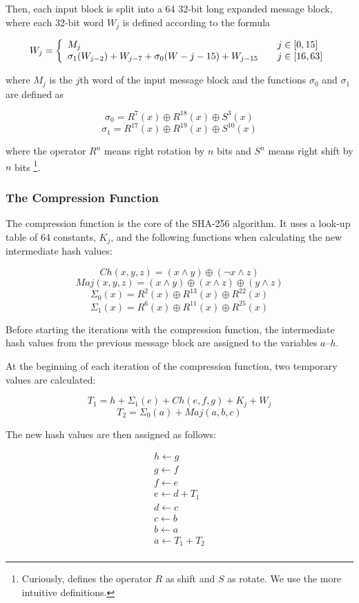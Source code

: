 Then, each input block is split into a 64 32-bit long expanded message block, where
each 32-bit word $W_j$ is defined according to the formula

\[ W_j = \left\{
	\begin{array}{l l}
		M_j & \quad j \in \left[0, 15\right]\\
		\sigma_1(W_{j - 2}) + W_{j - 7} + \sigma_0(W-{j - 15}) + W_{j - 15} & \quad j \in \left[16, 63\right]
	\end{array}
\right.\]

\noindent where $M_j$ is the $j$th word of the input message block and the functions
$\sigma_0$ and $\sigma_1$ are defined as

\[\sigma_0 = R^7(x) \oplus R^{18}(x) \oplus S^3(x)\]
\[\sigma_1 = R^{17}(x) \oplus R^{19}(x) \oplus S^{10}(x)\]

\noindent where the operator $R^n$ means right rotation by $n$ bits and $S^n$ means right shift by $n$
bits \footnote{Curiously, \cite{sha-spec} defines the operator $R$ as shift and $S$ as rotate.
We use the more intuitive definitions.}.

\subsubsection{The Compression Function}
The compression function is the core of the SHA-256 algorithm. It uses a look-up table
of 64 constants, $K_j$, and the following functions when calculating the new intermediate
hash values:

\[Ch(x,y,z) = (x \wedge y) \oplus (\neg x \wedge z)\]
\[Maj(x, y, z) = (x \wedge y) \oplus (x \wedge z) \oplus (y \wedge z)\]
\[\Sigma_0(x) = R^2(x) \oplus R^{13}(x) \oplus R^{22}(x)\]
\[\Sigma_1(x) = R^6(x) \oplus R^{11}(x) \oplus R^{25}(x)\]

Before starting the iterations with the compression function, the intermediate
hash values from the previous message block are assigned to the variables $a$--$h$.

At the beginning of each iteration of the compression function, two temporary
values are calculated:

\[T_1 = h + \Sigma_1(e) + Ch(e, f, g) + K_j + W_j\]
\[T_2 = \Sigma_0(a) + Maj(a, b, c)\]

The new hash values are then assigned as follows:

\[\begin{array}{l}
	h \leftarrow g \\
	g \leftarrow f \\
	f \leftarrow e \\
	e \leftarrow d + T_1\\
	d \leftarrow c \\
	c \leftarrow b \\
	b \leftarrow a \\
	a \leftarrow T_1 + T_2 \\
\end{array}\]

